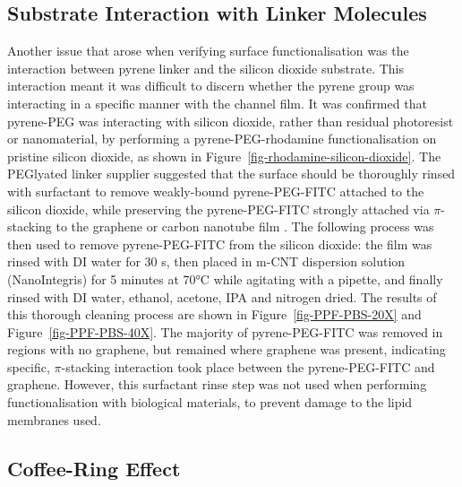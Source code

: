 \documentclass[
  a4paper,
]{scrbook}
\begin{document}
\hypertarget{sec-pyrene-interactions}{%
\subsection{Substrate Interaction with Linker
Molecules}\label{sec-pyrene-interactions}}

Another issue that arose when verifying surface functionalisation was
the interaction between pyrene linker and the silicon dioxide substrate.
This interaction meant it was difficult to discern whether the pyrene
group was interacting in a specific manner with the channel film. It was
confirmed that pyrene-PEG was interacting with silicon dioxide, rather
than residual photoresist or nanomaterial, by performing a
pyrene-PEG-rhodamine functionalisation on pristine silicon dioxide, as
shown in Figure~\ref{fig-rhodamine-silicon-dioxide}. The PEGlyated
linker supplier suggested that the surface should be thoroughly rinsed
with surfactant to remove weakly-bound pyrene-PEG-FITC attached to the
silicon dioxide, while preserving the pyrene-PEG-FITC strongly attached
via \(\pi\)-stacking to the graphene or carbon nanotube film
\autocite{CreativePEGworks2022}. The following process was then used to
remove pyrene-PEG-FITC from the silicon dioxide: the film was rinsed
with DI water for 30 s, then placed in m-CNT dispersion solution
(NanoIntegris) for 5 minutes at 70°C while agitating with a pipette, and
finally rinsed with DI water, ethanol, acetone, IPA and nitrogen dried.
The results of this thorough cleaning process are shown in
Figure~\ref{fig-PPF-PBS-20X} and Figure~\ref{fig-PPF-PBS-40X}. The
majority of pyrene-PEG-FITC was removed in regions with no graphene, but
remained where graphene was present, indicating specific,
\(\pi\)-stacking interaction took place between the pyrene-PEG-FITC and
graphene. However, this surfactant rinse step was not used when
performing functionalisation with biological materials, to prevent
damage to the lipid membranes used.

\hypertarget{sec-coffee-ring}{%
\subsection{Coffee-Ring Effect}\label{sec-coffee-ring}}
\end{document}
